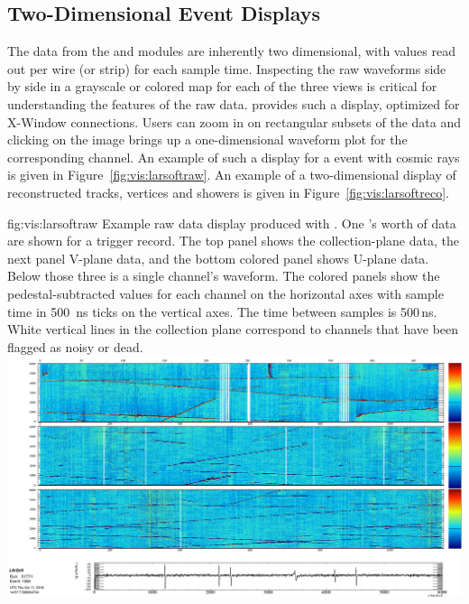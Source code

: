 \documentclass[../main-v1.tex]{subfiles}
\begin{document}
\subsection{Two-Dimensional Event Displays}
\label{sec:visualization:2d}

The data from the  and  modules are inherently two dimensional, with  values read out per wire (or strip) for each sample time.  Inspecting the raw waveforms side by side in a grayscale or colored map for each of the three views is critical for understanding the features of the raw data.   provides such a display,
optimized for X-Window connections.  Users can zoom in on rectangular subsets of the data and clicking on the image brings up a one-dimensional waveform plot for the corresponding channel.  An example of such a display for a  event with cosmic rays is given in Figure~\ref{fig:vis:larsoftraw}.  An example of a two-dimensional display of reconstructed tracks, vertices and showers is given in Figure~\ref{fig:vis:larsoftreco}.  

\begin{dunefigure}
{fig:vis:larsoftraw} 
{Example raw data display produced with .  One 's worth of data are shown for a  trigger record. The top panel shows the collection-plane data, the next panel V-plane data, and the bottom colored panel shows U-plane data.  Below those three is a single channel's waveform.  The colored panels show the pedestal-subtracted  values for each channel on the horizontal axes with sample time in 500~ns ticks on the vertical axes.  The time between samples is 500\,ns.  White vertical lines in the collection plane correspond to channels that have been flagged as noisy or dead.}
\includegraphics[width=0.9 \textwidth]{graphics/EventDisplays/pdsp_larsoft_rawevent.png}
\end{dunefigure}
\end{document}

